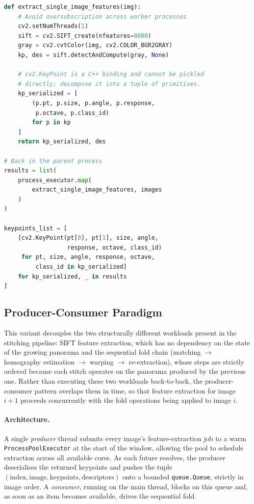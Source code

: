 \documentclass[10pt,twocolumn,letterpaper]{article}
\begin{document}
\begin{lstlisting}[language=Python, basicstyle=\footnotesize\ttfamily, frame=single, breaklines=true, breakatwhitespace=true, caption={Process-boundary serialization workaround for \texttt{cv2.KeyPoint} in \texttt{parallel.py}: each worker returns primitive tuples, which the parent process reconstructs into native OpenCV objects.}]
def extract_single_image_features(img):
    # Avoid oversubscription across worker processes
    cv2.setNumThreads(1)  
    sift = cv2.SIFT_create(nfeatures=8000)
    gray = cv2.cvtColor(img, cv2.COLOR_BGR2GRAY)
    kp, des = sift.detectAndCompute(gray, None)

    # cv2.KeyPoint is a C++ binding and cannot be pickled
    # directly; decompose it into a tuple of primitives.
    kp_serialized = [
        (p.pt, p.size, p.angle, p.response, 
         p.octave, p.class_id)
        for p in kp
    ]
    return kp_serialized, des

# Back in the parent process
results = list(
    process_executor.map(
        extract_single_image_features, images
    )
)

keypoints_list = [
    [cv2.KeyPoint(pt[0], pt[1], size, angle, 
                  response, octave, class_id)
     for pt, size, angle, response, octave, 
         class_id in kp_serialized]
    for kp_serialized, _ in results
]
\end{lstlisting}

\subsection{Producer-Consumer Paradigm}

This variant decouples the two structurally different workloads present in
the stitching pipeline: SIFT feature extraction, which has no dependency on
the state of the growing panorama and the sequential fold chain
(matching \(\rightarrow\) homography estimation \(\rightarrow\) warping
\(\rightarrow\) re-extraction), whose steps are strictly ordered because
each stitch operates on the panorama produced by the previous one. Rather
than executing these two workloads back-to-back, the producer-consumer
pattern overlaps them in time, so that feature extraction for image
\(i+1\) proceeds concurrently with the fold operations being applied to
image \(i\).

\paragraph{Architecture.}
A single \emph{producer} thread submits every image's feature-extraction
job to a warm \texttt{ProcessPoolExecutor} at the start of the window,
allowing the pool to schedule extraction across all available cores. As
each future resolves, the producer deserialises the returned keypoints and
pushes the tuple \((\text{index}, \text{image}, \text{keypoints},
\text{descriptors})\) onto a bounded \texttt{queue.Queue}, strictly in
image order. A \emph{consumer}, running on the main thread, blocks on this
queue and, as soon as an item becomes available, drives the sequential
fold.
\end{document}
